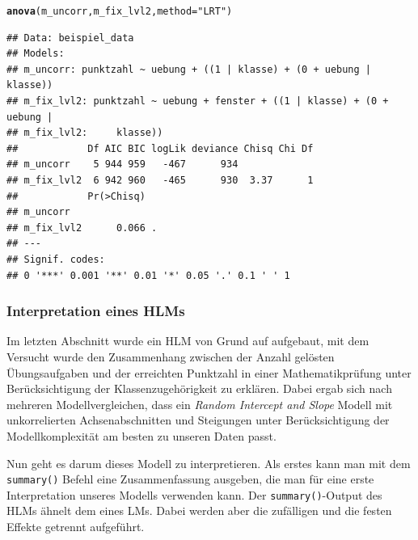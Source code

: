 \documentclass[12pt]{article}\usepackage[]{graphicx}\usepackage[]{color}
\makeatletter
\newcommand{\hlstr}[1]{\textcolor[rgb]{0.192,0.494,0.8}{#1}}%
\newcommand{\hlstd}[1]{\textcolor[rgb]{0.345,0.345,0.345}{#1}}%
\newcommand{\hlkwc}[1]{\textcolor[rgb]{0.333,0.667,0.333}{#1}}%
\newcommand{\hlkwd}[1]{\textcolor[rgb]{0.737,0.353,0.396}{\textbf{#1}}}%
\newenvironment{kframe}{%
 \def\at@end@of@kframe{}%
 \ifinner\ifhmode%
  \def\at@end@of@kframe{\end{minipage}}%
  \begin{minipage}{\columnwidth}%
 \fi\fi%
 \def\FrameCommand##1{\hskip\@totalleftmargin \hskip-\fboxsep
 \colorbox{shadecolor}{##1}\hskip-\fboxsep
     \hskip-\linewidth \hskip-\@totalleftmargin \hskip\columnwidth}%
 \MakeFramed {\advance\hsize-\width
   \@totalleftmargin\z@ \linewidth\hsize
   \@setminipage}}%
 {\par\unskip\endMakeFramed%
 \at@end@of@kframe}
\newenvironment{knitrout}{}{} %
\makeatother
\begin{document}
\singlespacing
\begin{knitrout}
\color{fgcolor}\begin{kframe}
\begin{alltt}
\hlkwd{anova}\hlstd{(m_uncorr, m_fix_lvl2,} \hlkwc{method} \hlstd{=} \hlstr{"LRT"}\hlstd{)}
\end{alltt}


{\ttfamily\noindent\itshape\color{messagecolor}{\#\# refitting model(s) with ML (instead of REML)}}\begin{verbatim}
## Data: beispiel_data
## Models:
## m_uncorr: punktzahl ~ uebung + ((1 | klasse) + (0 + uebung | klasse))
## m_fix_lvl2: punktzahl ~ uebung + fenster + ((1 | klasse) + (0 + uebung | 
## m_fix_lvl2:     klasse))
##            Df AIC BIC logLik deviance Chisq Chi Df
## m_uncorr    5 944 959   -467      934             
## m_fix_lvl2  6 942 960   -465      930  3.37      1
##            Pr(>Chisq)  
## m_uncorr               
## m_fix_lvl2      0.066 .
## ---
## Signif. codes:  
## 0 '***' 0.001 '**' 0.01 '*' 0.05 '.' 0.1 ' ' 1
\end{verbatim}
\end{kframe}
\end{knitrout}

\subsubsection{Interpretation eines HLMs}
Im letzten Abschnitt wurde ein HLM von Grund auf aufgebaut, mit dem Versucht wurde den Zusammenhang zwischen der Anzahl gelösten Übungsaufgaben und der erreichten Punktzahl in einer Mathematikprüfung unter Berücksichtigung der Klassenzugehörigkeit zu erklären. Dabei ergab sich nach mehreren Modellvergleichen, dass ein \textit{Random Intercept and Slope} Modell mit unkorrelierten Achsenabschnitten und Steigungen unter Berücksichtigung der Modellkomplexität am besten zu unseren Daten passt.

Nun geht es darum dieses Modell zu interpretieren. Als erstes kann man mit dem \texttt{summary()} Befehl eine Zusammenfassung ausgeben, die man für eine erste Interpretation unseres Modells verwenden kann. Der \texttt{summary()}-Output des HLMs ähnelt dem eines LMs. Dabei werden aber die zufälligen und die festen Effekte getrennt aufgeführt. 
\end{document}
